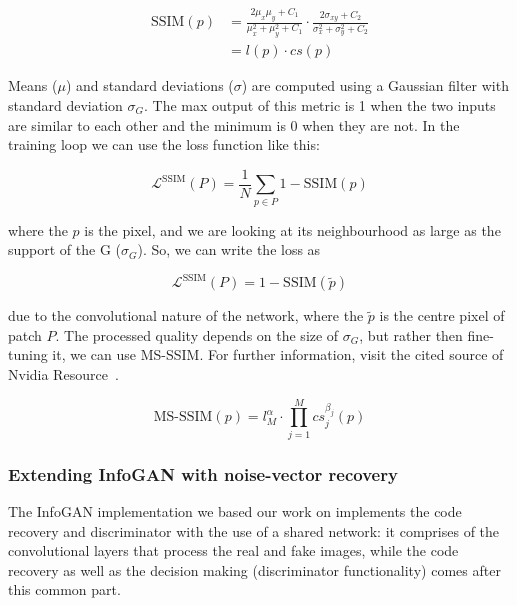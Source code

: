 \documentclass{egpubl}
\begin{document}
\begin{equation}
\begin{aligned}
\mathrm{SSIM}(p) &= \frac{2\mu_x\mu_y + C_1}{\mu_x^2 + \mu_y^2 + C_1}\cdot\frac{2\sigma_{xy} + C_2}{\sigma_x^2 + \sigma_y^2 + C_2} \\ 
&= l(p)\cdot cs(p)
\end{aligned}
\end{equation}

Means ($\mu$) and standard deviations ($\sigma$) are computed using %
a Gaussian filter with standard deviation $\sigma_G$. The max output of this metric %
is 1 when the two inputs are similar to each other and the minimum is 0 when they are not. In the training loop we can use the loss function like this:

\begin{equation}
\mathcal{L}^{\mathrm{SSIM}}(P) = \frac{1}{N}\sum_{p \in P}1-\mathrm{SSIM}(p)
\end{equation}

where the $p$ is the pixel, %
and we are looking at its neighbourhood as large as the support of the G ($\sigma_G$). So, we can write the loss as

\begin{equation}
\mathcal{L}^{\mathrm{SSIM}}(P) = 1-\mathrm{SSIM}(\tilde{p})
\end{equation}

due to the convolutional nature of the network, where the $\tilde{p}$ is the centre pixel of patch $P$. 
The processed quality depends on the size of $\sigma_G$, but rather then fine-tuning it, %
we can use MS-SSIM. For further information, visit the cited source of Nvidia Resource~\cite{zhao2015loss}.

\begin{equation}
\mathrm{MS\mbox{-}SSIM}(p) = l_M^\alpha \cdot \prod_{j=1}^{M}cs_j^{\beta_j}(p)
\end{equation}

\subsubsection{Extending InfoGAN with noise-vector recovery}

The InfoGAN implementation we based our work on implements the code recovery and discriminator with the use of a shared network: it comprises of the convolutional layers that process the real and fake images, while the code recovery as well as the decision making (discriminator functionality) comes after this common part.
\end{document}
